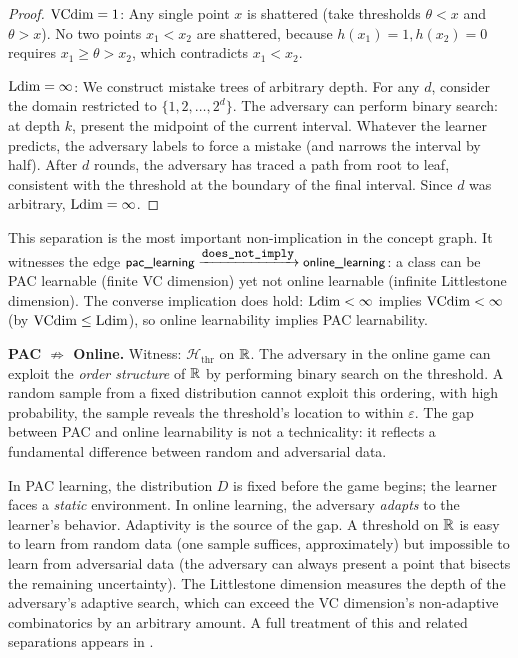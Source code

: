 \begin{proof}
$\mathrm{VCdim} = 1$: Any single point $x$ is shattered (take thresholds $\theta < x$ and $\theta > x$). No two points $x_1 < x_2$ are shattered, because $h(x_1) = 1, h(x_2) = 0$ requires $x_1 \geq \theta > x_2$, which contradicts $x_1 < x_2$.

$\mathrm{Ldim} = \infty$: We construct mistake trees of arbitrary depth. For any $d$, consider the domain restricted to $\{1, 2, \ldots, 2^d\}$. The adversary can perform binary search: at depth $k$, present the midpoint of the current interval. Whatever the learner predicts, the adversary labels to force a mistake (and narrows the interval by half). After $d$ rounds, the adversary has traced a path from root to leaf, consistent with the threshold at the boundary of the final interval. Since $d$ was arbitrary, $\mathrm{Ldim} = \infty$.
\end{proof}

This separation is the most important non-implication in the concept graph. It witnesses the edge $\textsf{\small pac\_learning} \xrightarrow{\texttt{\small does\_not\_imply}} \textsf{\small online\_learning}$: a class can be PAC learnable (finite VC dimension) yet not online learnable (infinite Littlestone dimension). The converse implication does hold: $\mathrm{Ldim} < \infty$ implies $\mathrm{VCdim} < \infty$ (by $\mathrm{VCdim} \leq \mathrm{Ldim}$), so online learnability implies PAC learnability.

\begin{separation}
\textbf{PAC $\not\Rightarrow$ Online.} Witness: $\mathcal{H}_{\mathrm{thr}}$ on $\mathbb{R}$. The adversary in the online game can exploit the \emph{order structure} of $\mathbb{R}$ by performing binary search on the threshold. A random sample from a fixed distribution cannot exploit this ordering, with high probability, the sample reveals the threshold's location to within $\varepsilon$. The gap between PAC and online learnability is not a technicality: it reflects a fundamental difference between random and adversarial data.
\end{separation}

\begin{remark}
\label{rmk:gap-intuition}
In PAC learning, the distribution $D$ is fixed before the game begins; the learner faces a \emph{static} environment. In online learning, the adversary \emph{adapts} to the learner's behavior. Adaptivity is the source of the gap. A threshold on $\mathbb{R}$ is easy to learn from random data (one sample suffices, approximately) but impossible to learn from adversarial data (the adversary can always present a point that bisects the remaining uncertainty). The Littlestone dimension measures the depth of the adversary's adaptive search, which can exceed the VC dimension's non-adaptive combinatorics by an arbitrary amount. A full treatment of this and related separations appears in .
\end{remark}

